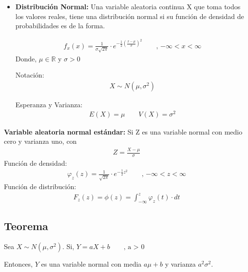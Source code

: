 \documentclass{templateNote}
\begin{document}
\begin{itemize}
  \item \textbf{Distribución Normal:} Una variable aleatoria continua X que toma todos los valores reales, tiene una
  distribución normal si su función de densidad de probabilidades es de la forma.

  \begin{align*}
    f_x(x) = \frac{1}{\sigma \sqrt{2 \pi}} \cdot e^{\displaystyle -\frac{1}{2} \left( \frac{x - \mu}{\sigma} \right)^2} \qquad \text{, $-\infty < x < \infty$}
  \end{align*}
  Donde, $\mu \in \mathbb{R}$ y $\sigma > 0 $

  Notación:
  \begin{align*}
    X \sim N(\mu, \sigma^2)
  \end{align*}

  Esperanza y Varianza:
  \begin{align*}
    E(X) = \mu \qquad V(X) = \sigma^2
  \end{align*}
\end{itemize}

\newpage
\subitem \textbf{Variable aleatoria normal estándar:} Si Z es una variable normal con medio cero y varianza uno, con
\begin{align*}
  Z = \frac{X - \mu}{\sigma}
\end{align*}
Función de densidad:
\begin{align*}
  \varphi_z(z) = \frac{1}{\sqrt{2 \pi}} \cdot e^{\displaystyle -\frac{1}{2} z^2} \qquad \text{, $-\infty < z < \infty$}
\end{align*}
Función de distribución:
\begin{align*}
  F_z(z) = \phi(z) = \int_{-\infty}^{z} \varphi_z(t) \cdot dt
\end{align*}

\subsection*{Teorema}
Sea $X \sim N(\mu, \sigma^2)$. Si, $Y = aX + b \qquad \text{, a > 0}$

Entonces, $Y$ es una variable normal con media $a\mu + b$ y varianza $a^2 \sigma^2$.
\end{document}

